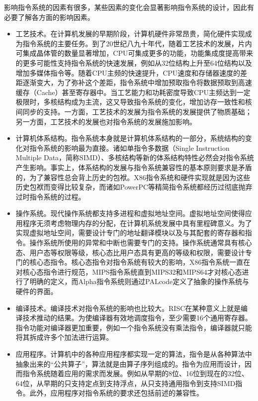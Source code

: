 \documentclass[]{ctexbook}
\begin{document}
影响指令系统的因素有很多，某些因素的变化会显著影响指令系统的设计，因此有必要了解各方面的影响因素。

\begin{itemize}
\item
  工艺技术。在计算机发展的早期阶段，计算机硬件非常昂贵，简化硬件实现成为指令系统的主要任务。到了20世纪八九十年代，随着工艺技术的发展，片内可集成晶体管的数量显著增加，CPU可集成更多的功能，功能集成度提高带来的更多可能性支持指令系统的快速发展，例如从32位结构上升至64位结构以及增加多媒体指令等。随着CPU主频的快速提升，CPU速度和存储器速度的差距逐渐变大，为了弥补这个差距，指令系统中增加预取指令将数据预取到高速缓存（Cache）甚至寄存器中。当工艺能力和功耗密度导致CPU主频达到一定极限时，多核结构成为主流，这又导致指令系统的变化，增加访存一致性和核间同步的支持。一方面，工艺技术的发展为指令系统的发展提供了物质基础；另一方面，工艺技术的发展也对指令系统的发展施加影响。
\item
  计算机体系结构。指令系统本身就是计算机体系结构的一部分，系统结构的变化对指令系统的影响最为直接。诸如单指令多数据（Single Instruction Multiple Data，简称SIMD）、多核结构等新的体系结构特性必然会对指令系统产生影响。事实上，体系结构的发展与指令系统兼容性的基本原则要求是矛盾的，为了兼容性总会背上历史的包袱。X86指令系统和硬件实现就是因为这些历史包袱而变得比较复杂，而诸如PowerPC等精简指令系统都经历过彻底抛弃过时指令系统的过程。
\item
  操作系统。现代操作系统都支持多进程和虚拟地址空间。虚拟地址空间使得应用程序无须考虑物理内存的分配，在计算机系统发展中具有里程碑意义。为了实现虚拟地址空间，需要设计专门的地址翻译模块以及与其配套的寄存器和指令。操作系统所使用的异常和中断也需要专门的支持。操作系统通常具有核心态、用户态等权限等级，核心态比用户态具有更高的等级和权限，需要设计专门的核心态指令。核心态指令对指令系统有较大的影响，X86指令系统一直在对核心态指令进行规范，MIPS指令系统直到MIPS32和MIPS64才对核心态进行了明确的定义，而Alpha指令系统则通过PALcode定义了抽象的操作系统与硬件的界面。
\item
  编译技术。编译技术对指令系统的影响也比较大。RISC在某种意义上就是编译技术推动的结果。为使编译器有效地调度指令，至少需要16个通用寄存器。指令功能对编译器更加重要，例如一个指令系统没有乘法指令，编译器就只能将其拆成许多个加法进行运算。
\item
  应用程序。计算机中的各种应用程序都实现一定的算法，指令是从各种算法中抽象出来的``公共算子''，算法就是由算子序列组成的。指令为应用而设计，因而指令系统随着应用的需求而发展。例如从早期的8位、16位到现在的32位、64位，从早期的只支持定点到支持浮点，从只支持通用指令到支持SIMD指令。此外，应用程序对指令系统的要求还包括前述的兼容性。
\end{itemize}
\end{document}
